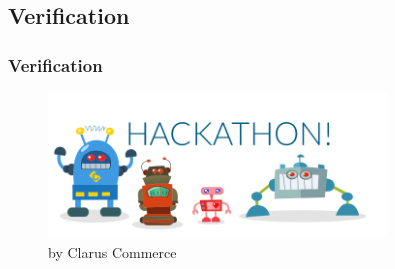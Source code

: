 \subsection{Verification}

\begin{frame}\frametitle{Verification}
    \begin{figure}[ht!]
        \centering
        \includegraphics[width=0.8\textwidth]{./media/hackathon-graphic}
        \caption{by Clarus Commerce}
        \label{fig:goal-design}
    \end{figure}
\end{frame}